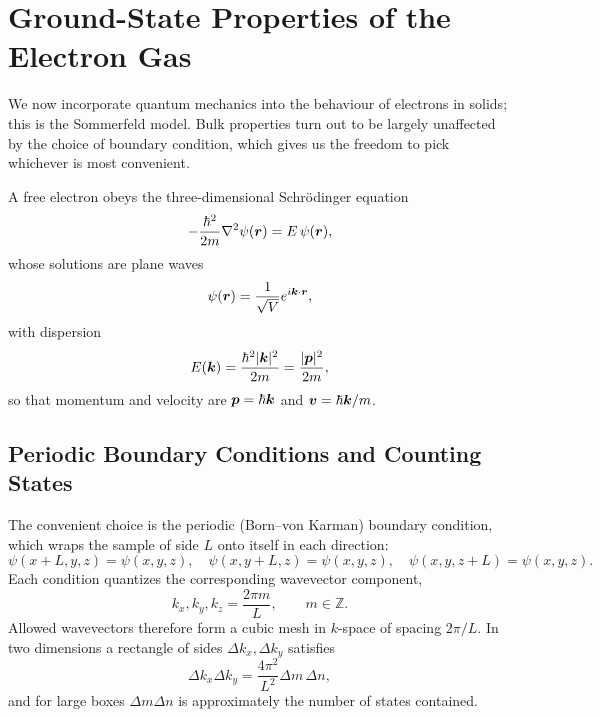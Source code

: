 \section{Ground-State Properties of the Electron Gas}

We now incorporate quantum mechanics into the behaviour of electrons in solids; this is the Sommerfeld model. Bulk properties turn out to be largely unaffected by the choice of boundary condition, which gives us the freedom to pick whichever is most convenient.

A free electron obeys the three-dimensional Schr\"odinger equation
\begin{equation}
    -\frac{\hbar^2}{2m}\laplacian{\psi(\lvect{r})} = E\,\psi(\lvect{r}),
\end{equation}
whose solutions are plane waves
\begin{equation}
    \psi(\bm{r}) = \frac{1}{\sqrt{V}}e^{i\bm{k}\cdot\bm{r}},
\end{equation}
with dispersion
\begin{equation}
    E(\bm{k}) = \frac{\hbar^2|\bm{k}|^2}{2m} = \frac{|\bm{p}|^2}{2m},
\end{equation}
so that momentum and velocity are $\bm{p} = \hbar\bm{k}$ and $\bm{v} = \hbar\bm{k}/m$.

\subsection{Periodic Boundary Conditions and Counting States}

The convenient choice is the periodic (Born--von Karman) boundary condition, which wraps the sample of side $L$ onto itself in each direction:
\begin{equation}
    \psi(x+L,y,z) = \psi(x,y,z), \quad \psi(x,y+L,z) = \psi(x,y,z), \quad \psi(x,y,z+L) = \psi(x,y,z).
\end{equation}
Each condition quantizes the corresponding wavevector component,
\begin{equation}
    k_x, k_y, k_z = \frac{2\pi m}{L}, \qquad m \in \mathbb{Z}.
\end{equation}
Allowed wavevectors therefore form a cubic mesh in $k$-space of spacing $2\pi/L$. In two dimensions a rectangle of sides $\Delta k_x, \Delta k_y$ satisfies
\begin{equation}
    \Delta k_x \Delta k_y = \frac{4\pi^2}{L^2}\Delta m\,\Delta n,
\end{equation}
and for large boxes $\Delta m \Delta n$ is approximately the number of states contained.

